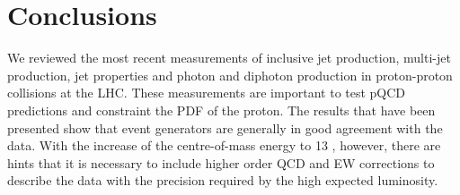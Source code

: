 \documentclass{PoS}
\begin{document}
\section{Conclusions}

We reviewed the most recent measurements of inclusive jet production, multi-jet production, jet properties and
photon and diphoton production in proton-proton collisions at the LHC. These measurements are important to test pQCD
predictions and constraint the PDF of the proton. The results that have been presented show that
event generators are generally in good agreement with the data. With the increase of the
centre-of-mass energy to 13 \TeV, however, there are hints that it is necessary to include higher order QCD and EW
corrections to describe the data with the precision required by the high expected luminosity. 
\end{document}
